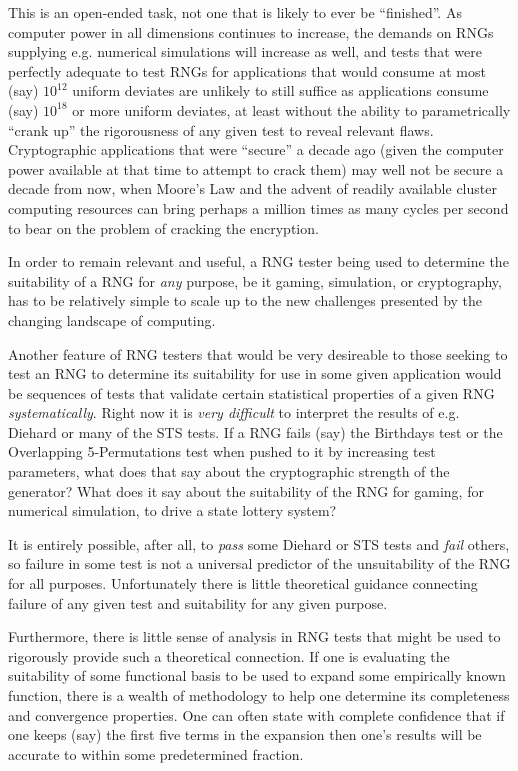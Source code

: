 \documentclass{book}
\begin{document}
This is an open-ended task, not one that is likely to ever be
``finished''.  As computer power in all dimensions continues to
increase, the demands on RNGs supplying e.g. numerical simulations will
increase as well, and tests that were perfectly adequate to test RNGs
for applications that would consume at most (say) $10^{12}$ uniform
deviates are unlikely to still suffice as applications consume (say)
$10^{18}$ or more uniform deviates, at least without the ability to
parametrically ``crank up'' the rigorousness of any given test to reveal
relevant flaws.  Cryptographic applications that were ``secure'' a
decade ago (given the computer power available at that time to attempt
to crack them) may well not be secure a decade from now, when Moore's
Law and the advent of readily available cluster computing resources can
bring perhaps a million times as many cycles per second to bear on the
problem of cracking the encryption.

In order to remain relevant and useful, a RNG tester being used to
determine the suitability of a RNG for {\em any} purpose, be it gaming,
simulation, or cryptography, has to be relatively simple to scale up to
the new challenges presented by the changing landscape of computing.

Another feature of RNG testers that would be very desireable to those
seeking to test an RNG to determine its suitability for use in some
given application would be sequences of tests that validate certain
statistical properties of a given RNG {\em systematically}.  Right now
it is {\em very difficult} to interpret the results of e.g. Diehard or
many of the STS tests.  If a RNG fails (say) the Birthdays test or the
Overlapping 5-{}Permutations test when pushed to it by increasing test
parameters, what does that say about the cryptographic strength of the
generator?  What does it say about the suitability of the RNG for
gaming, for numerical simulation, to drive a state lottery system?

It is entirely possible, after all, to {\em pass} some Diehard or STS
tests and {\em fail} others, so failure in some test is not a universal
predictor of the unsuitability of the RNG for all purposes.
Unfortunately there is little theoretical guidance connecting failure of
any given test and suitability for any given purpose.  

Furthermore, there is little sense of analysis in RNG tests that might
be used to rigorously provide such a theoretical connection.  If one is
evaluating the suitability of some functional basis to be used to expand
some empirically known function, there is a wealth of methodology to
help one determine its completeness and convergence properties.  One can
often state with complete confidence that if one keeps (say) the first
five terms in the expansion then one's results will be accurate to
within some predetermined fraction.  
\end{document}
